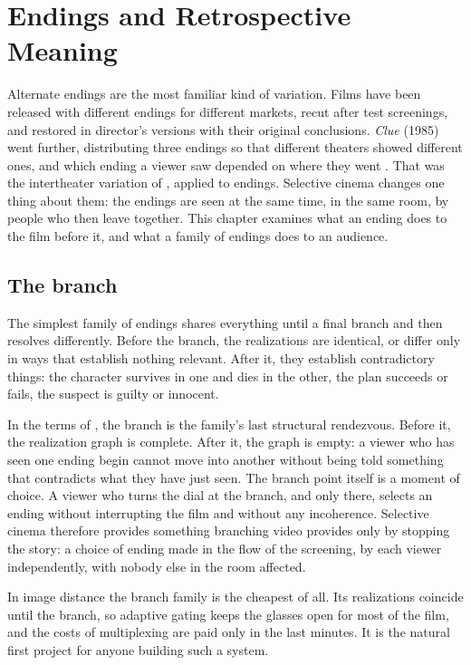 \chapter{Endings and Retrospective Meaning}\label{ch:endings}

Alternate endings are the most familiar kind of variation. Films have been released with different endings for different markets, recut after test screenings, and restored in director's versions with their original conclusions. \emph{Clue} (1985) went further, distributing three endings so that different theaters showed different ones, and which ending a viewer saw depended on where they went \cite{clue}. That was the intertheater variation of , applied to endings. Selective cinema changes one thing about them: the endings are seen at the same time, in the same room, by people who then leave together. This chapter examines what an ending does to the film before it, and what a family of endings does to an audience.

\section{The branch}

The simplest family of endings shares everything until a final branch and then resolves differently. Before the branch, the realizations are identical, or differ only in ways that establish nothing relevant. After it, they establish contradictory things: the character survives in one and dies in the other, the plan succeeds or fails, the suspect is guilty or innocent.

In the terms of , the branch is the family's last structural rendezvous. Before it, the realization graph is complete. After it, the graph is empty: a viewer who has seen one ending begin cannot move into another without being told something that contradicts what they have just seen. The branch point itself is a moment of choice. A viewer who turns the dial at the branch, and only there, selects an ending without interrupting the film and without any incoherence. Selective cinema therefore provides something branching video provides only by stopping the story: a choice of ending made in the flow of the screening, by each viewer independently, with nobody else in the room affected.

In image distance the branch family is the cheapest of all. Its realizations coincide until the branch, so adaptive gating keeps the glasses open for most of the film, and the costs of multiplexing are paid only in the last minutes. It is the natural first project for anyone building such a system.

